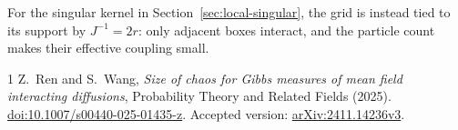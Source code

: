 \documentclass[11pt,reqno]{amsart}
\numberwithin{equation}{section}
\theoremstyle{plain}
\theoremstyle{definition}
\begin{document}
For the singular kernel in Section~\ref{sec:local-singular}, the grid is instead tied to its support by $J^{-1}=2r$: only adjacent boxes interact, and the particle count makes their effective coupling small.

\begin{thebibliography}{1}
Z.~Ren and S.~Wang,
\emph{Size of chaos for Gibbs measures of mean field interacting diffusions},
Probability Theory and Related Fields (2025).
\href{https://doi.org/10.1007/s00440-025-01435-z}{doi:10.1007/s00440-025-01435-z}.
Accepted version: \href{https://arxiv.org/abs/2411.14236v3}{arXiv:2411.14236v3}.
\end{thebibliography}
\end{document}
